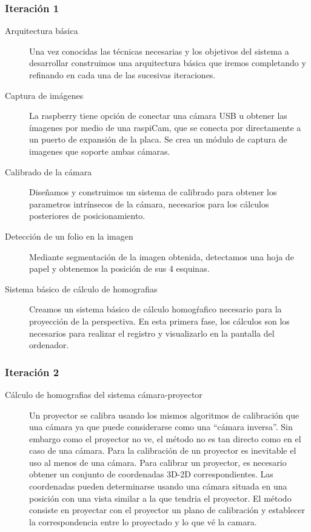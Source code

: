 \subsubsection{Iteración 1}
\begin{description}
\item [Arquitectura básica] Una vez conocidas las técnicas necesarias y los objetivos del sistema a desarrollar construimos una arquitectura básica que iremos completando y refinando en cada una de las sucesivas iteraciones.
\item [Captura de imágenes] La raspberry tiene opción de conectar una cámara USB u obtener las ímagenes por medio de una raspiCam, que se conecta por directamente a un puerto de expansión de la placa. Se crea un módulo de captura de imagenes que soporte ambas cámaras.

\item [Calibrado de la cámara] Diseñamos y construimos un sistema de calibrado para obtener los parametros intrínsecos de la cámara, necesarios para los cálculos posteriores de posicionamiento.

\item [Detección de un folio en la imagen] Mediante segmentación de la imagen obtenida, detectamos una hoja de papel y obtenemos la posición de sus 4 esquinas.

\item [Sistema básico de cálculo de homografias] Creamos un sistema básico de cálculo homogŕafico necesario para la proyección de la perspectiva. En esta primera fase, los cálculos son los
  necesarios para realizar el registro y visualizarlo en la pantalla del ordenador.

\end{description}

\subsubsection{Iteración 2}
\begin{description}
\item [Cálculo de homografias del sistema cámara-proyector] Un proyector se calibra usando los mismos algoritmos de calibración que una cámara ya que puede considerarse como una ``cámara inversa''. Sin embargo como el proyector no ve, el método no es tan directo como en el caso de una cámara.
Para la calibración de un proyector es inevitable el uso al menos de una cámara. Para calibrar un proyector, es necesario obtener un conjunto de coordenadas 3D-2D correspondientes. Las coordenadas pueden determinarse usando una cámara situada en una posición con una vista similar a la que tendria el proyector. El método consiste en proyectar con el proyector un plano de calibración y establecer la correspondencia entre lo proyectado y lo que vé la camara.

\end{description}


